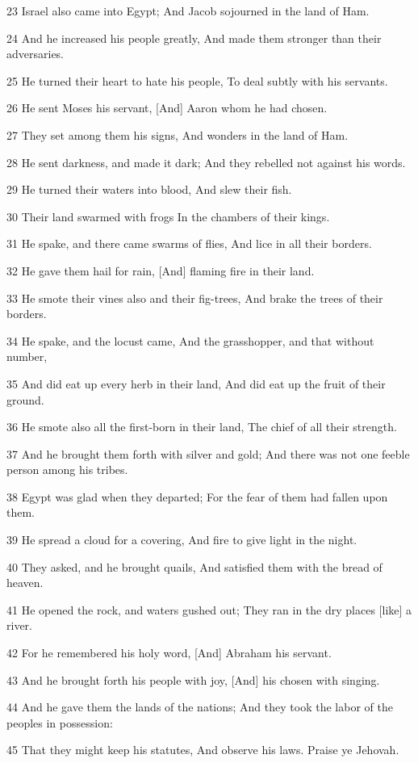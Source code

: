 \par 23 Israel also came into Egypt; And Jacob sojourned in the land of Ham.
\par 24 And he increased his people greatly, And made them stronger than their adversaries.
\par 25 He turned their heart to hate his people, To deal subtly with his servants.
\par 26 He sent Moses his servant, [And] Aaron whom he had chosen.
\par 27 They set among them his signs, And wonders in the land of Ham.
\par 28 He sent darkness, and made it dark; And they rebelled not against his words.
\par 29 He turned their waters into blood, And slew their fish.
\par 30 Their land swarmed with frogs In the chambers of their kings.
\par 31 He spake, and there came swarms of flies, And lice in all their borders.
\par 32 He gave them hail for rain, [And] flaming fire in their land.
\par 33 He smote their vines also and their fig-trees, And brake the trees of their borders.
\par 34 He spake, and the locust came, And the grasshopper, and that without number,
\par 35 And did eat up every herb in their land, And did eat up the fruit of their ground.
\par 36 He smote also all the first-born in their land, The chief of all their strength.
\par 37 And he brought them forth with silver and gold; And there was not one feeble person among his tribes.
\par 38 Egypt was glad when they departed; For the fear of them had fallen upon them.
\par 39 He spread a cloud for a covering, And fire to give light in the night.
\par 40 They asked, and he brought quails, And satisfied them with the bread of heaven.
\par 41 He opened the rock, and waters gushed out; They ran in the dry places [like] a river.
\par 42 For he remembered his holy word, [And] Abraham his servant.
\par 43 And he brought forth his people with joy, [And] his chosen with singing.
\par 44 And he gave them the lands of the nations; And they took the labor of the peoples in possession:
\par 45 That they might keep his statutes, And observe his laws. Praise ye Jehovah.

